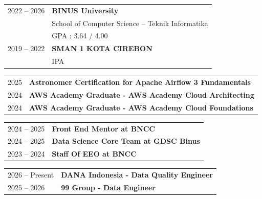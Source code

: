 \begin{singlespace}

\noindent
\begin{tabular}{p{4.5cm} p{9.5cm}}
2022 -- 2026 & \textbf{BINUS University} \\
             & School of Computer Science -- Teknik Informatika \\
             & GPA : 3.64 / 4.00 \\
2019 -- 2022 & \textbf{SMAN 1 KOTA CIREBON} \\
             & IPA \\
\end{tabular}


\noindent
\begin{tabular}{p{4.5cm} p{9.5cm}}
2025 & \textbf{Astronomer Certification for Apache Airflow 3 Fundamentals} \\
2024 & \textbf{AWS Academy Graduate - AWS Academy Cloud Architecting} \\
2024 & \textbf{AWS Academy Graduate - AWS Academy Cloud Foundations} \\
\end{tabular}


\noindent
\begin{tabular}{p{4.5cm} p{9.5cm}}
2024 -- 2025 & \textbf{Front End Mentor at BNCC} \\
2024 -- 2025 & \textbf{Data Science Core Team at GDSC Binus} \\
2023 -- 2024 & \textbf{Staff Of EEO at BNCC} \\
\end{tabular}


\noindent
\begin{tabular}{p{4.5cm} p{9.5cm}}
2026 -- Present & \textbf{DANA Indonesia - Data Quality Engineer} \\
2025 -- 2026 & \textbf{99 Group - Data Engineer} \\
\end{tabular}
\end{singlespace}

\newpage


